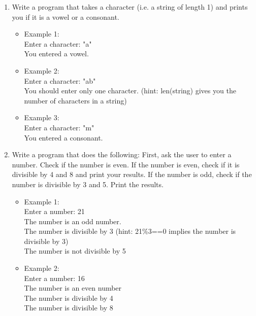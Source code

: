 \documentclass[10pt,a4paper]{article}
\begin{document}
\begin{enumerate}
\item Write a program that takes a character (i.e. a string of length 1) and prints you if it is a vowel or a consonant.
\begin{itemize}
\item Example 1:
\\ Enter a character: "a"
\\ You entered a vowel.
\item Example 2:
\\ Enter a character: "ab"
\\ You should enter only one character. (hint: len(string) gives you the number of characters in a string)
\item Example 3:
\\ Enter a character: "m"
\\ You entered a consonant.
\end{itemize}
\item Write a program that does the following: First, ask the user to enter a number. Check if the number is even. If the number is even, check if it is divisible by 4 and 8 and print your results. If the number is odd, check if the number is divisible by 3 and 5. Print the results.
\begin{itemize}
\item Example 1:
\\ Enter a number: 21
\\ The number is an odd number.
\\ The number is divisible by 3 (hint: 21\%3==0 implies the number is divisible by 3)
\\ The number is not divisible by 5
\item Example 2: 
\\ Enter a number: 16
\\ The number is an even number
\\ The number is divisible by 4
\\ The number is divisible by 8
\end{itemize}
\end{enumerate}
\end{document}
